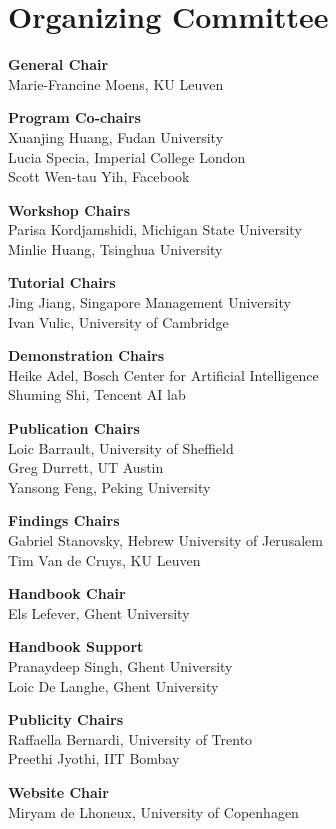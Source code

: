 
\section{Organizing Committee}

\setlength{\parindent}{0pt}

{\bf General Chair} \\
Marie-Francine Moens, KU Leuven

{\bf Program Co-chairs} \\
Xuanjing Huang, Fudan University\\
Lucia Specia, Imperial College London\\
Scott Wen-tau Yih, Facebook

{\bf Workshop Chairs} \\
Parisa Kordjamshidi, Michigan State University\\
Minlie Huang, Tsinghua University

{\bf Tutorial Chairs} \\
Jing Jiang, Singapore Management University \\
Ivan Vulic, University of Cambridge

{\bf Demonstration Chairs} \\
Heike Adel, Bosch Center for Artificial Intelligence \\
Shuming Shi, Tencent AI lab

{\bf Publication Chairs} \\
Loic Barrault, University of Sheffield \\
Greg Durrett, UT Austin \\
Yansong Feng, Peking University

{\bf Findings Chairs} \\
Gabriel Stanovsky, Hebrew University of Jerusalem \\
Tim Van de Cruys, KU Leuven

{\bf Handbook Chair} \\
Els Lefever, Ghent University

{\bf Handbook Support} \\
Pranaydeep Singh, Ghent University\\
Loic De Langhe, Ghent University

{\bf Publicity Chairs} \\
Raffaella Bernardi, University of Trento \\
Preethi Jyothi, IIT Bombay

{\bf Website Chair} \\
Miryam de Lhoneux, University of Copenhagen


